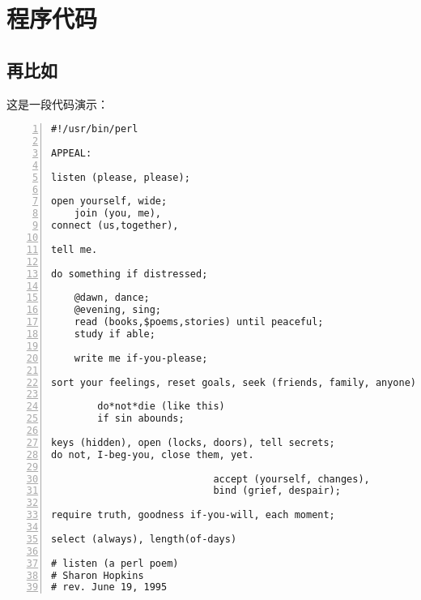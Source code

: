 \mainmatter
{}
\chapter{程序代码}\label{app:src}
\section{再比如}
这是一段代码演示：
\begin{Verbatim}[frame=single,numbers=left]
#!/usr/bin/perl

APPEAL:

listen (please, please);

open yourself, wide;
    join (you, me),
connect (us,together),

tell me.

do something if distressed;

    @dawn, dance;
    @evening, sing;
    read (books,$poems,stories) until peaceful;
    study if able;

    write me if-you-please;

sort your feelings, reset goals, seek (friends, family, anyone);

        do*not*die (like this)
        if sin abounds;

keys (hidden), open (locks, doors), tell secrets;
do not, I-beg-you, close them, yet.

                            accept (yourself, changes),
                            bind (grief, despair);

require truth, goodness if-you-will, each moment;

select (always), length(of-days)

# listen (a perl poem)
# Sharon Hopkins
# rev. June 19, 1995
\end{Verbatim}
